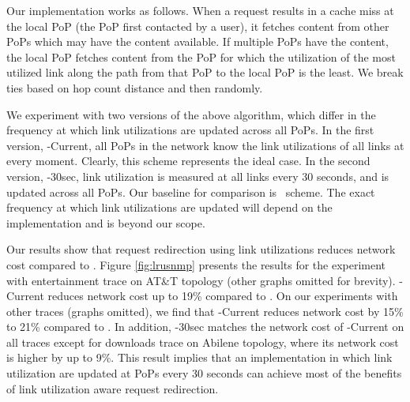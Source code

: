 Our implementation works as follows. When a request results in a cache miss at the local PoP (the PoP first contacted by a user), it fetches content from other PoPs  which may have the content available. If multiple PoPs have the content, the local PoP  fetches content from the PoP for which the utilization of the most utilized link  along the path from that PoP to the local PoP is the least. We break ties based on hop count distance and then randomly.


We experiment with two versions of the above algorithm, which differ in the frequency at which link utilizations are updated across all PoPs. In the first version, \textsf{\invlru-Current}, all PoPs in the network know the link utilizations  of all links at every moment. Clearly, this scheme represents the ideal case. In the second version, \textsf{\invlru-30sec}, link utilization is measured at all links every 30 seconds, and is updated across all PoPs. Our baseline for comparison is \invlru\ scheme. The exact frequency at which link utilizations are updated will depend on the implementation and is beyond our scope. 




Our results show that request redirection using link utilizations reduces network cost compared to \invlru.   
Figure \ref{fig:lrusnmp} presents the results for the experiment with entertainment trace on AT\&T topology (other graphs omitted for brevity).  \textsf{\invlru-Current} reduces network cost up to 19\% compared to \invlru.  On our experiments with other traces (graphs omitted), we find that \textsf{\invlru-Current} reduces network cost by 15\% to 21\% compared to \invlru.  In addition,  \textsf{\invlru-30sec} matches the network cost of \textsf{\invlru-Current} on all traces except for downloads trace on Abilene topology, where its network cost is higher by up to 9\%. This result implies that an implementation in which link utilization are updated at PoPs every 30 seconds can achieve most of the benefits of link utilization aware request redirection. 


 










